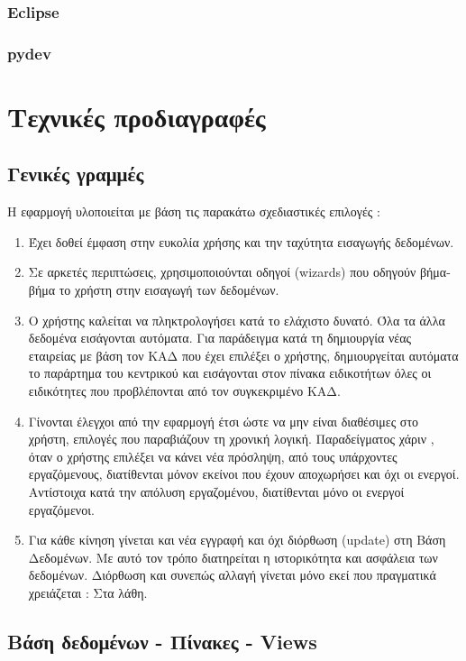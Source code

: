 \documentclass[A4,10pt,greek]{book}
\begin{document}
\subsection{Eclipse}

\subsection {pydev}

\chapter{Τεχνικές προδιαγραφές}
\section{Γενικές γραμμές}
Η εφαρμογή υλοποιείται με βάση τις παρακάτω σχεδιαστικές επιλογές :
\begin{enumerate}
\item Έχει δοθεί έμφαση στην ευκολία χρήσης και την ταχύτητα εισαγωγής δεδομένων.
\item Σε αρκετές περιπτώσεις, χρησιμοποιούνται οδηγοί (wizards) που οδηγούν βήμα-βήμα το χρήστη στην εισαγωγή των δεδομένων.
\item Ο χρήστης καλείται να πληκτρολογήσει κατά το ελάχιστο δυνατό. Όλα τα άλλα δεδομένα εισάγονται αυτόματα. Για παράδειγμα κατά τη δημιουργία νέας εταιρείας με βάση τον ΚΑΔ που έχει επιλέξει ο χρήστης, δημιουργείται αυτόματα το παράρτημα του κεντρικού και εισάγονται στον πίνακα ειδικοτήτων όλες οι ειδικότητες που προβλέπονται από τον συγκεκριμένο ΚΑΔ.
\item Γίνονται έλεγχοι από την εφαρμογή έτσι ώστε να μην είναι διαθέσιμες στο χρήστη, επιλογές που παραβιάζουν τη χρονική λογική. Παραδείγματος χάριν , όταν ο χρήστης επιλέξει να κάνει νέα πρόσληψη, από τους υπάρχοντες εργαζόμενους, διατίθενται μόνον εκείνοι που έχουν αποχωρήσει και όχι οι ενεργοί. Αντίστοιχα κατά την απόλυση εργαζομένου, διατίθενται μόνο οι ενεργοί εργαζόμενοι.
\item Για κάθε κίνηση γίνεται και νέα εγγραφή και όχι διόρθωση (update) στη Βάση Δεδομένων. Με αυτό τον τρόπο διατηρείται η ιστορικότητα και ασφάλεια των δεδομένων. Διόρθωση και συνεπώς αλλαγή γίνεται μόνο εκεί που πραγματικά χρειάζεται : Στα λάθη. 
\end{enumerate}
\section{Βάση δεδομένων - Πίνακες - Views }
\end{document}
